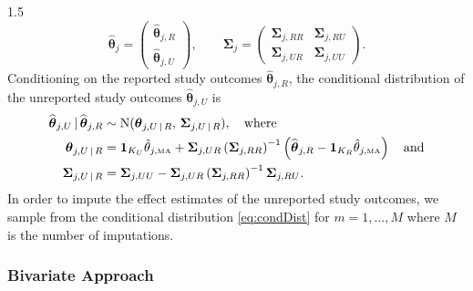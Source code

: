 \documentclass{article}
\begin{document}
\begin{spacing}{1.5}
\begin{equation} \label{eq:partitioned_uni}
\widehat{\boldsymbol{\theta}}_j = 
\begin{pmatrix}
\widehat{\boldsymbol{\theta}}_{j,R} \\
\widehat{\boldsymbol{\theta}}_{j,U}
\end{pmatrix}, 
\qquad
\boldsymbol{\Sigma}_j = 
\begin{pmatrix}
\boldsymbol{\Sigma}_{j,RR} & 
\boldsymbol{\Sigma}_{j,RU} \\
\boldsymbol{\Sigma}_{j,UR} 
& \boldsymbol{\Sigma}_{j,UU}
\end{pmatrix}.
\end{equation}
Conditioning on the reported study outcomes $\widehat{\boldsymbol{\theta}}_{j,R}$, the conditional distribution of the unreported study outcomes $\widehat{\boldsymbol{\theta}}_{j,U}$ is \cite[p. 349]{held2020likelihood}
\begin{align}
\widehat{\boldsymbol{\theta}}_{j,U} \,\vert\, \widehat{\boldsymbol{\theta}}_{j,R} 
&\sim \operatorname{N}(\boldsymbol{\theta}_{j,U \,\vert\, R},\, \boldsymbol{\Sigma}_{j,U \,\vert\, R}), \quad \text{where} \label{eq:condDist} \\
\boldsymbol{\theta}_{j,U \,\vert\, R} 
&= \boldsymbol{1}_{K_U} \hat{\theta}_{j,\tiny{\mbox{MA}}} + \boldsymbol{\Sigma}_{j,UR} \left( \boldsymbol{\Sigma}_{j,RR} \right)^{-1} \left( \widehat{\boldsymbol{\theta}}_{j,R} - \boldsymbol{1}_{K_R} \hat{\theta}_{j,\tiny{\mbox{MA}}} \right) \quad \text{and} \nonumber \\
\boldsymbol{\Sigma}_{j,U \,\vert\, R} 
&= \boldsymbol{\Sigma}_{j,UU} - \boldsymbol{\Sigma}_{j,UR} \left( \boldsymbol{\Sigma}_{j,RR} \right)^{-1} \boldsymbol{\Sigma}_{j,RU}. \nonumber
\end{align}
In order to impute the effect estimates of the unreported study outcomes, we sample from the conditional distribution \eqref{eq:condDist} for $m = 1, \dots, M$ where $M$ is the number of imputations.

\subsubsection{Bivariate Approach} 
\label{bivariateMVN}


\end{spacing}
\end{document}
